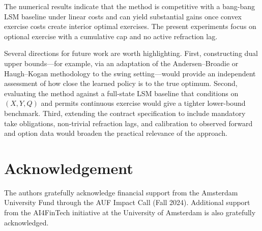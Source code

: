 \documentclass[a4paper,fleqn]{cas-dc}
\begin{document}
The numerical results indicate that the method is competitive with a bang-bang LSM baseline under linear costs and can yield substantial gains once convex exercise costs create interior optimal exercises. The present experiments focus on optional exercise with a cumulative cap and no active refraction lag.

Several directions for future work are worth highlighting. First, constructing dual upper bounds---for example, via an adaptation of the Andersen--Broadie or Haugh--Kogan methodology to the swing setting---would provide an independent assessment of how close the learned policy is to the true optimum. Second, evaluating the method against a full-state LSM baseline that conditions on $(X,Y,Q)$ and permits continuous exercise would give a tighter lower-bound benchmark. Third, extending the contract specification to include mandatory take obligations, non-trivial refraction lags, and calibration to observed forward and option data would broaden the practical relevance of the approach.

\section*{Acknowledgement}

The authors gratefully acknowledge financial support from the Amsterdam University Fund through the AUF Impact Call (Fall 2024). Additional support from the AI4FinTech initiative at the University of Amsterdam is also gratefully acknowledged.



\end{document}
